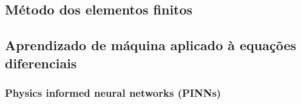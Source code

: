 \subsection{Método dos elementos finitos}

\subsection{Aprendizado de máquina aplicado à equações diferenciais}

\subsubsection{Physics informed neural networks (PINNs)}